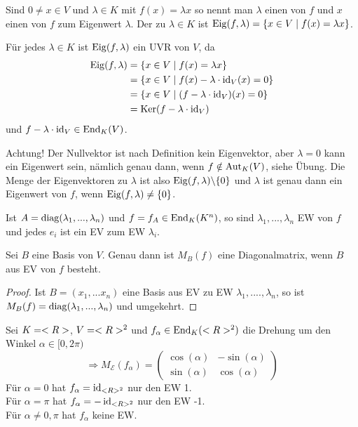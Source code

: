 \begin{definition}
	Sind $0\neq x\in V$ und $\lambda\in K$ mit $f(x)=\lambda x$ so nennt man $\lambda$ einen  von $f$ und $x$ einen  von $f$ zum Eigenwert $\lambda$. Der  zu $\lambda\in K$ ist $\operatorname{Eig} (f,\lambda)=\{x\in V\mid f(x)=\lambda x\}$.
\end{definition}

\begin{remark}
	Für jedes $\lambda\in K$ ist $\operatorname{Eig} (f,\lambda)$ ein UVR von $V$, da
	\begin{align}
		\operatorname{Eig} (f,\lambda) &= \{x\in V\mid f(x)=\lambda x\} \notag \\
		&= \{x\in V\mid f(x)-\lambda\cdot\operatorname{id}_V(x)=0\} \notag \\
		&= \{x\in V\mid (f-\lambda\cdot\operatorname{id}_V)(x)=0\} \notag \\
		&= \operatorname{Ker} (f-\lambda\cdot\operatorname{id}_V) \notag
	\end{align}
	und $f-\lambda\cdot\operatorname{id}_V\in\operatorname{End}_K(V)$.
\end{remark}

\begin{remark}
	Achtung! Der Nullvektor ist nach Definition kein Eigenvektor, aber $\lambda=0$ kann ein Eigenwert sein, nämlich genau dann, wenn $f\notin\operatorname{Aut}_K(V)$, siehe Übung. Die Menge der Eigenvektoren zu $\lambda$ ist also $\operatorname{Eig} (f,\lambda)\backslash\{0\}$ und $\lambda$ ist genau dann ein Eigenwert von $f$, wenn $\operatorname{Eig} (f,\lambda)\neq\{0\}$.
\end{remark}

\begin{example}
	Ist $A=\operatorname{diag}(\lambda_1,...,\lambda_n)$ und $f=f_A\in\operatorname{End}_K(K^n)$, so sind $\lambda_1,...,\lambda_n$ EW von $f$ und jedes $e_i$ ist ein EV zum EW $\lambda_i$.
\end{example}

\begin{proposition}
	Sei $B$ eine Basis von $V$. Genau dann ist $M_B(f)$ eine Diagonalmatrix, wenn $B$ aus EV von $f$ besteht.
\end{proposition}
\begin{proof}
	Ist $B=(x_1,...x_n)$ eine Basis aus EV zu EW $\lambda_1,....,\lambda_n$, so ist $M_B(f)= \operatorname{diag}(\lambda_1,...,\lambda_n)$ und umgekehrt.
\end{proof}

\begin{example}
	Sei $K=<R>$, $V=<R>^2$ und $f_{\alpha}\in\operatorname{End}_K(<R>^2)$ die Drehung um den Winkel $\alpha\in [0,2\pi)$ \\
	\[\Rightarrow M_{\mathcal{E}}(f_{\alpha})=\begin{pmatrix}\cos(\alpha)&-\sin(\alpha) \\ \sin(\alpha) & \cos(\alpha)\end{pmatrix}\]
	Für $\alpha=0$ hat $f_{\alpha}=\operatorname{id}_{<R>^2}$ nur den EW 1. \\
	Für $\alpha=\pi$ hat $f_{\alpha}=-\operatorname{id}_{<R>^2}$ nur den EW -1. \\
	Für $\alpha\neq 0,\pi$ hat $f_{\alpha}$ keine EW. %
\end{example}


